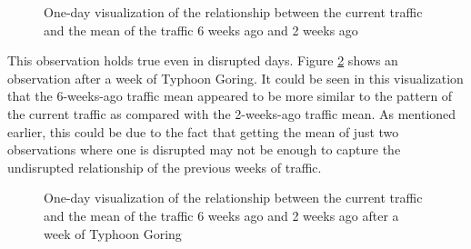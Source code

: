 \begin{figure}[!t] 
\centering
  \caption{One-day visualization of the relationship between the current traffic and the mean of the traffic 6 weeks ago and 2 weeks ago}
  \label{figure_traffic_mean_2weeks_vs_6weeks}
\end{figure}



This observation holds true even in disrupted days. Figure \ref{figure_traffic_mean_2weeks_vs_6weeks_disrupted} shows an observation after a week of Typhoon Goring. It could be seen in this visualization that the 6-weeks-ago traffic mean appeared to be more similar to the pattern of the current traffic as compared with the 2-weeks-ago traffic mean. As mentioned earlier, this could be due to the fact that getting the mean of just two observations where one is disrupted may not be enough to capture the undisrupted relationship of the previous weeks of traffic.

\begin{figure}[!t] 
\centering
  \centering
  \caption{One-day visualization of the relationship between the current traffic and the mean of the traffic 6 weeks ago and 2 weeks ago after a week of Typhoon Goring}
  \label{figure_traffic_mean_2weeks_vs_6weeks_disrupted}
\end{figure}


